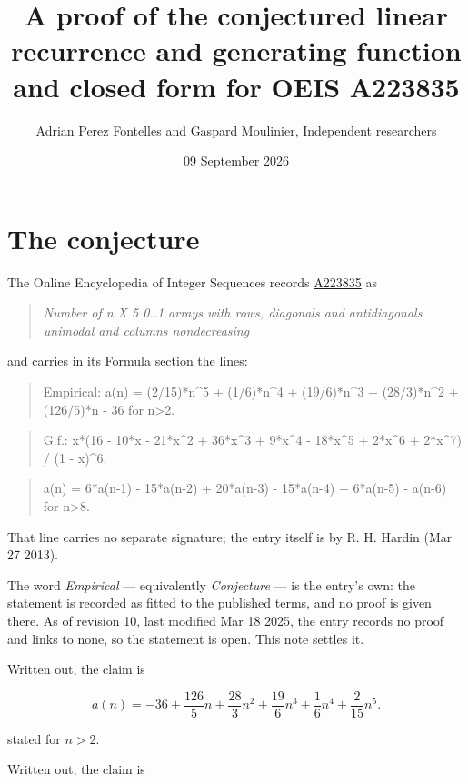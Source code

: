\documentclass[11pt]{article}
\title{A proof of the conjectured linear recurrence and generating function and closed form for OEIS A223835}
\author{Adrian Perez Fontelles and Gaspard Moulinier, Independent researchers}
\date{09 September 2026}
\theoremstyle{definition}
\begin{document}
\maketitle
\section{The conjecture}

The Online Encyclopedia of Integer Sequences records \href{https://oeis.org/A223835}{A223835} as

\begin{quote}\itshape Number of n X 5 0..1 arrays with rows, diagonals and antidiagonals unimodal and columns nondecreasing\end{quote}

and carries in its Formula section the lines:

\begin{quote}\ttfamily Empirical: a(n) = (2/15)*n\textasciicircum{}5 + (1/6)*n\textasciicircum{}4 + (19/6)*n\textasciicircum{}3 + (28/3)*n\textasciicircum{}2 + (126/5)*n - 36 for n>2.\end{quote}

\begin{quote}\ttfamily G.f.: x*(16 - 10*x - 21*x\textasciicircum{}2 + 36*x\textasciicircum{}3 + 9*x\textasciicircum{}4 - 18*x\textasciicircum{}5 + 2*x\textasciicircum{}6 + 2*x\textasciicircum{}7) / (1 - x)\textasciicircum{}6.\end{quote}

\begin{quote}\ttfamily a(n) = 6*a(n-1) - 15*a(n-2) + 20*a(n-3) - 15*a(n-4) + 6*a(n-5) - a(n-6) for n>8.\end{quote}

That line carries no separate signature; the entry itself is by R. H. Hardin (Mar 27 2013).

The word {\itshape Empirical} --- equivalently {\itshape Conjecture} --- is the entry's own: the statement is recorded as fitted to the published terms, and no proof is given there. As of revision 10, last modified Mar 18 2025, the entry records no proof and links to none, so the statement is open. This note settles it.

Written out, the claim is

\[a(n) = -36 + \frac{126}{5}n + \frac{28}{3}n^{2} + \frac{19}{6}n^{3} + \frac{1}{6}n^{4} + \frac{2}{15}n^{5}.\]

stated for $n > 2$.

Written out, the claim is
\end{document}
